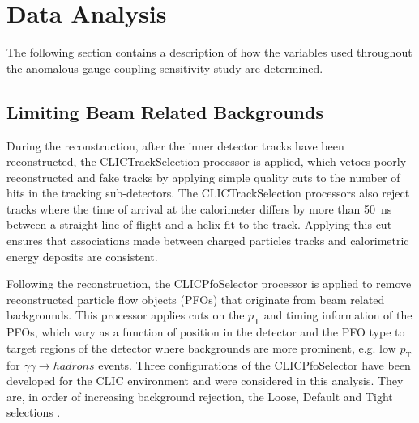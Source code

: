 
\section{Data Analysis}
\label{sec:dataanalysis}
The following section contains a description of how the variables used throughout the anomalous gauge coupling sensitivity study are determined.


\subsection{Limiting Beam Related Backgrounds} 
During the reconstruction, after the inner detector tracks have been reconstructed, the CLICTrackSelection processor is applied, which vetoes poorly reconstructed and fake tracks by applying simple quality cuts to the number of hits in the tracking sub-detectors.  The CLICTrackSelection processors also reject tracks where the time of arrival at the calorimeter differs by more than 50~ns between a straight line of flight and a helix fit to the track.  Applying this cut ensures that associations made between charged particles tracks and calorimetric energy deposits are consistent.  

Following the reconstruction, the CLICPfoSelector processor is applied to remove reconstructed particle flow objects (PFOs) that originate from beam related backgrounds.  This processor applies cuts on the $p_{\text{T}}$ and timing information of the PFOs, which vary as a function of position in the detector and the PFO type to target regions of the detector where backgrounds are more prominent, e.g. low $p_{\text{T}}$ for $\gamma\gamma \rightarrow hadrons$ events.  Three configurations of the CLICPfoSelector  have been developed for the CLIC environment and were considered in this analysis.  They are, in order of increasing background rejection, the Loose, Default and Tight selections \cite{arXiv:1209.4039}. 


